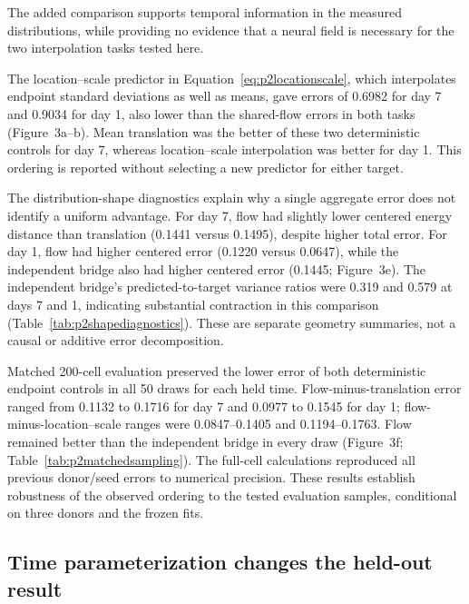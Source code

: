 \documentclass[10pt,a4paper]{article}
\begin{document}
The added comparison supports temporal information in the measured distributions, while providing no evidence that a neural field is necessary for the two interpolation tasks tested here.

The location--scale predictor in Equation~\eqref{eq:p2locationscale}, which interpolates endpoint standard deviations as well as means, gave errors of 0.6982 for day 7 and 0.9034 for day 1, also lower than the shared-flow errors in both tasks (Figure~3a--b). Mean translation was the better of these two deterministic controls for day 7, whereas location--scale interpolation was better for day 1. This ordering is reported without selecting a new predictor for either target.

The distribution-shape diagnostics explain why a single aggregate error does not identify a uniform advantage. For day 7, flow had slightly lower centered energy distance than translation (0.1441 versus 0.1495), despite higher total error. For day 1, flow had higher centered error (0.1220 versus 0.0647), while the independent bridge also had higher centered error (0.1445; Figure~3e). The independent bridge's predicted-to-target variance ratios were 0.319 and 0.579 at days 7 and 1, indicating substantial contraction in this comparison (Table~\ref{tab:p2shapediagnostics}). These are separate geometry summaries, not a causal or additive error decomposition.

Matched 200-cell evaluation preserved the lower error of both deterministic endpoint controls in all 50 draws for each held time. Flow-minus-translation error ranged from 0.1132 to 0.1716 for day 7 and 0.0977 to 0.1545 for day 1; flow-minus-location--scale ranges were 0.0847--0.1405 and 0.1194--0.1763. Flow remained better than the independent bridge in every draw (Figure~3f; Table~\ref{tab:p2matchedsampling}). The full-cell calculations reproduced all previous donor/seed errors to numerical precision. These results establish robustness of the observed ordering to the tested evaluation samples, conditional on three donors and the frozen fits.

\subsection{Time parameterization changes the held-out result}
\end{document}
